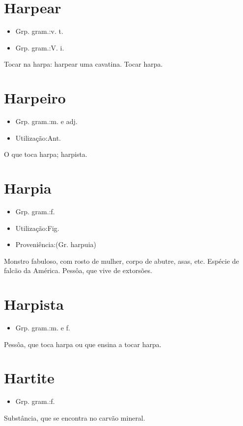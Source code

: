 \documentclass{article}
\begin{document}
\section{Harpear}
\begin{itemize}
\item {Grp. gram.:v. t.}
\end{itemize}
\begin{itemize}
\item {Grp. gram.:V. i.}
\end{itemize}
Tocar na harpa: \textunderscore harpear uma cavatina\textunderscore .
Tocar harpa.
\section{Harpeiro}
\begin{itemize}
\item {Grp. gram.:m.  e  adj.}
\end{itemize}
\begin{itemize}
\item {Utilização:Ant.}
\end{itemize}
O que toca harpa; harpista.
\section{Harpia}
\begin{itemize}
\item {Grp. gram.:f.}
\end{itemize}
\begin{itemize}
\item {Utilização:Fig.}
\end{itemize}
\begin{itemize}
\item {Proveniência:(Gr. \textunderscore harpuia\textunderscore )}
\end{itemize}
Monstro fabuloso, com rosto de mulher, corpo de abutre, asas, etc.
Espécie de falcão da América.
Pessôa, que vive de extorsões.
\section{Harpista}
\begin{itemize}
\item {Grp. gram.:m.  e  f.}
\end{itemize}
Pessôa, que toca harpa ou que ensina a tocar harpa.
\section{Hartite}
\begin{itemize}
\item {Grp. gram.:f.}
\end{itemize}
Substância, que se encontra no carvão mineral.
\end{document}
